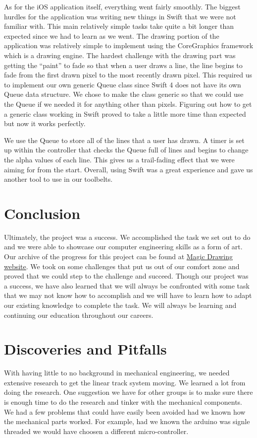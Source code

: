 \documentclass[11pt]{IEEEtran}
\begin{document}
As for the iOS application itself, everything went fairly smoothly. The biggest hurdles for the application was writing new things in Swift that we were not familiar with. This main relatively simple tasks take quite a bit longer than expected since we had to learn as we went. The drawing portion of the application was relatively simple to implement using the CoreGraphics framework which is a drawing engine. The hardest challenge with the drawing part was getting the “paint” to fade so that when a user draws a line, the line begins to fade from the first drawn pixel to the most recently drawn pixel. This required us to implement our own generic Queue class since Swift 4 does not have its own Queue data structure. We chose to make the class generic so that we could use the Queue if we needed it for anything other than pixels. Figuring out how to get a generic class working in Swift proved to take a little more time than expected but now it works perfectly.

We use the Queue to store all of the lines that a user has drawn. A timer is set up within the controller that checks the Queue full of lines and begins to change the alpha values of each line. This gives us a trail-fading effect that we were aiming for from the start. Overall, using Swift was a great experience and gave us another tool to use in our toolbelts.

\section{Conclusion}
Ultimately, the project was a success. We accomplished the task we set out to do and we were able to showcase our computer engineering skills as a form of art. Our archive of the progress for this project can be found at \href{https:://magicdrawing.unityx.io}{Magic Drawing website}. We took on some challenges that put us out of our comfort zone and proved that we could step to the challenge and succeed. Though our project was a success, we have also learned that we will always be confronted with some task that we may not know how to accomplish and we will have to learn how to adapt our existing knowledge to complete the task. We will always be learning and continuing our education throughout our careers.

\newpage

\appendices

\section{Discoveries and Pitfalls}
With having little to no background in mechanical engineering, we needed extensive research to get the linear track system moving. We learned a lot from doing the research. One suggestion we have for other groups is to make sure there is enough time to do the research and tinker with the mechanical components. We had a few problems that could have easily been avoided had we known how the mechanical parts worked. For example, had we known the arduino was signle threaded we would have choosen a different micro-controller.
\end{document}
